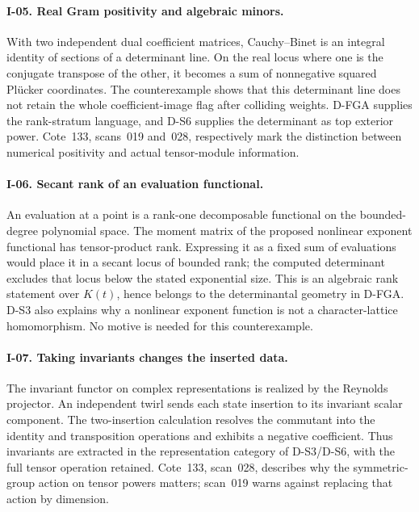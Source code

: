 \documentclass[11pt,a4paper]{article}
\theoremstyle{definition}\newtheorem{definition}{Definition}
\begin{document}
\paragraph{I-05. Real Gram positivity and algebraic minors.}
With two independent dual coefficient matrices, Cauchy--Binet is an integral identity of sections of a determinant line. On the real locus where one is the conjugate transpose of the other, it becomes a sum of nonnegative squared Pl\"ucker coordinates. The counterexample shows that this determinant line does not retain the whole coefficient-image flag after colliding weights. D-FGA supplies the rank-stratum language, and D-S6 supplies the determinant as top exterior power. Cote~133, scans~019 and~028, respectively mark the distinction between numerical positivity and actual tensor-module information.

\paragraph{I-06. Secant rank of an evaluation functional.}
An evaluation at a point is a rank-one decomposable functional on the bounded-degree polynomial space. The moment matrix of the proposed nonlinear exponent functional has tensor-product rank. Expressing it as a fixed sum of evaluations would place it in a secant locus of bounded rank; the computed determinant excludes that locus below the stated exponential size. This is an algebraic rank statement over $K(t)$, hence belongs to the determinantal geometry in D-FGA. D-S3 also explains why a nonlinear exponent function is not a character-lattice homomorphism. No motive is needed for this counterexample.

\paragraph{I-07. Taking invariants changes the inserted data.}
The invariant functor on complex representations is realized by the Reynolds projector. An independent twirl sends each state insertion to its invariant scalar component. The two-insertion calculation resolves the commutant into the identity and transposition operations and exhibits a negative coefficient. Thus invariants are extracted in the representation category of D-S3/D-S6, with the full tensor operation retained. Cote~133, scan~028, describes why the symmetric-group action on tensor powers matters; scan~019 warns against replacing that action by dimension.
\end{document}
